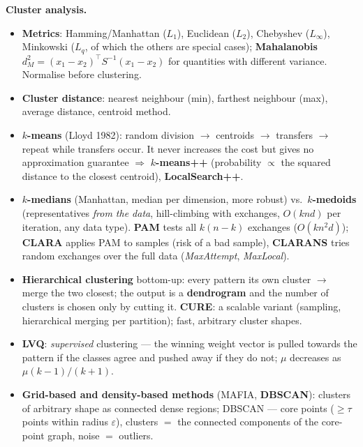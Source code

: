 \documentclass[11pt,a4paper]{article}
\theoremstyle{definition}
\begin{document}
\textbf{Cluster analysis.}
\begin{itemize}
\item \textbf{Metrics}: Hamming/Manhattan ($L_1$), Euclidean ($L_2$), Chebyshev ($L_\infty$),
      Minkowski ($L_q$, of which the others are special cases); \textbf{Mahalanobis}
      $d_M^2=(x_1-x_2)^{\!\top}S^{-1}(x_1-x_2)$ for quantities with different variance. Normalise
      before clustering.
\item \textbf{Cluster distance}: nearest neighbour (min), farthest neighbour (max), average
      distance, centroid method.
\item \textbf{$k$-means} (Lloyd 1982): random division $\to$ centroids $\to$ transfers $\to$ repeat
      while transfers occur. It never increases the cost but gives no approximation guarantee
      $\Rightarrow$ \textbf{$k$-means++} (probability $\propto$ the squared distance to the closest
      centroid), \textbf{LocalSearch++}.
\item \textbf{$k$-medians} (Manhattan, median per dimension, more robust) vs.\
      \textbf{$k$-medoids} (representatives \emph{from the data}, hill-climbing with exchanges,
      $O(knd)$ per iteration, any data type). \textbf{PAM} tests all $k(n-k)$ exchanges
      ($O(kn^2d)$); \textbf{CLARA} applies PAM to samples (risk of a bad sample),
      \textbf{CLARANS} tries random exchanges over the full data (\emph{MaxAttempt},
      \emph{MaxLocal}).
\item \textbf{Hierarchical clustering} bottom-up: every pattern its own cluster $\to$ merge the two
      closest; the output is a \textbf{dendrogram} and the number of clusters is chosen only by
      cutting it. \textbf{CURE}: a scalable variant (sampling, hierarchical merging per
      partition); fast, arbitrary cluster shapes.
\item \textbf{LVQ}: \emph{supervised} clustering --- the winning weight vector is pulled towards the
      pattern if the classes agree and pushed away if they do not; $\mu$ decreases as
      $\mu(k-1)/(k+1)$.
\item \textbf{Grid-based and density-based methods} (MAFIA, \textbf{DBSCAN}): clusters of
      arbitrary shape as connected dense regions; DBSCAN --- core points ($\ge\tau$ points
      within radius $\varepsilon$), clusters $=$ the connected components of the core-point
      graph, noise $=$ outliers.
\end{itemize}

\newpage
\end{document}
